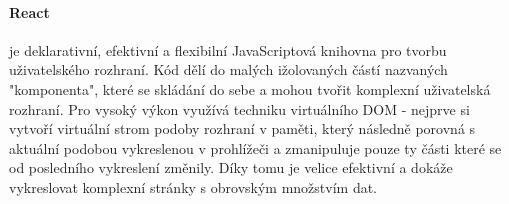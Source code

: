 \paragraph{React} je deklarativní, efektivní a flexibilní JavaScriptová knihovna pro tvorbu uživatelského rozhraní. Kód dělí do malých ižolovaných částí nazvaných "komponenta", které se skládání do sebe a mohou tvořit komplexní uživatelská rozhraní. Pro vysoký výkon využívá techniku virtuálního DOM - nejprve si vytvoří virtuální strom podoby rozhraní v paměti, který následně porovná s aktuální podobou vykreslenou v prohlížeči a zmanipuluje pouze ty části které se od posledního vykreslení změnily. Díky tomu je velice efektivní a dokáže vykreslovat komplexní stránky s obrovským množstvím dat.


